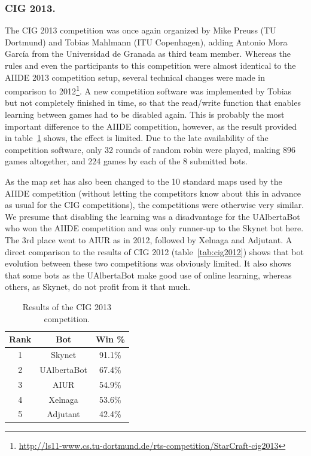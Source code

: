 \documentclass{llncs}
\begin{document}
\subsubsection{CIG 2013.} The CIG 2013 competition was once again
organized by Mike Preuss (TU Dortmund) and Tobias Mahlmann (ITU Copenhagen),
adding Antonio Mora Garc{\'i}a from the Universidad de Granada as
third team member. Whereas the rules and even the participants
to this competition were almost identical to the AIIDE 2013
competition setup, several technical changes were made in comparison
to 2012\footnote{\url{http://ls11-www.cs.tu-dortmund.de/rts-competition/StarCraft-cig2013}}.
A new competition software was implemented by Tobias but
not completely finished in time, so that the read/write function
that enables learning between games had to be disabled again. 
This is probably the most important difference to the AIIDE competition,
however, as the result provided in table~\ref{tab:cig2013} shows, the effect is
limited. Due to the late availability of the competition software,
only 32 rounds of random robin were played, making 896 games
altogether, and 224 games by each of the 8 submitted bots. 

As the map set has also been changed to the 10 standard
maps used by the AIIDE competition (without letting the competitors
know about this in advance as usual for the CIG competitions), 
the competitions were otherwise very similar. We presume that 
disabling the learning was a disadvantage for the UAlbertaBot who
won the AIIDE competition and was only runner-up to the Skynet bot
here. The 3rd place went to AIUR as in 2012, followed by 
Xelnaga and Adjutant. A direct comparison to the results of
CIG 2012 (table~\ref{tab:cig2012}) shows that bot evolution 
between these two competitions was obviously limited. It also
shows that some bots as the UAlbertaBot make good use of 
online learning, whereas others, as Skynet, do not profit from
it that much.




\begin{table}[t]
\caption{Results of the CIG 2013 competition.}
\label{tab:cig2013}
\centering
\begin{tabular}{|c|c|c|}
\hline
{\bfseries Rank} & {\bfseries Bot} & {\bfseries Win \%} \\
\hline
1 & Skynet & 91.1\% \\
2 & UAlbertaBot & 67.4\% \\
3 & AIUR & 54.9\% \\
4 & Xelnaga & 53.6\% \\
5 & Adjutant & 42.4\% \\ 
\hline
\end{tabular}
\end{table}
\end{document}
